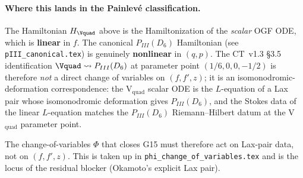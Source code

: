 \paragraph{Where this lands in the Painlev\'e classification.}
The Hamiltonian $H_{\Vquad}$ above is the Hamiltonization of
the \emph{scalar} OGF ODE, which is \textbf{linear} in $f$.
The canonical $P_{III}(D_6)$ Hamiltonian (see
\texttt{pIII\_canonical.tex}) is genuinely \textbf{nonlinear}
in $(q,p)$. The CT~v1.3 §3.5 identification
$\Vquad \rightsquigarrow P_{III}(D_6)$ at parameter point
$(1/6,0,0,-1/2)$ is therefore \emph{not} a direct change of
variables on $(f, f', z)$; it is an isomonodromic-deformation
correspondence: the V$_\mathrm{quad}$ scalar ODE is the
$L$-equation of a Lax pair whose isomonodromic deformation
gives $P_{III}(D_6)$, and the Stokes data of the linear
$L$-equation matches the $P_{III}(D_6)$ Riemann--Hilbert
datum at the V$_\mathrm{quad}$ parameter point.

The change-of-variables $\Phi$ that closes G15 must therefore
act on Lax-pair data, not on $(f,f',z)$. This is taken up in
\texttt{phi\_change\_of\_variables.tex} and is the locus of
the residual blocker (Okamoto's explicit Lax pair).
